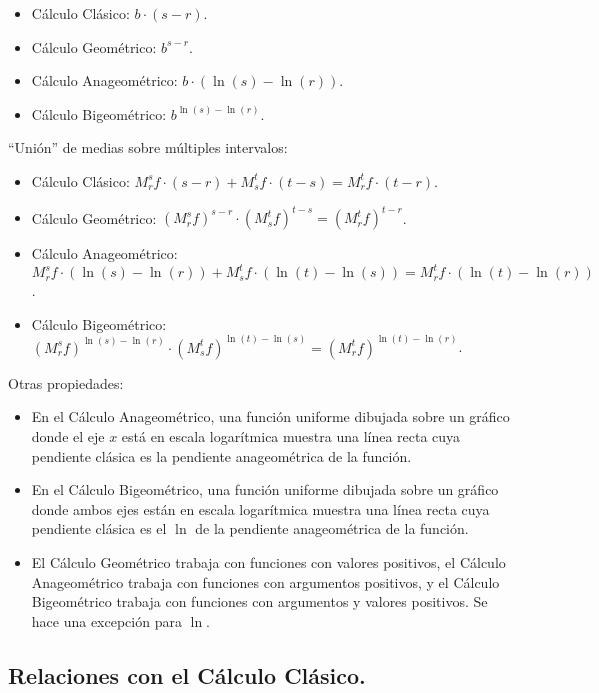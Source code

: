 \begin{itemize}
	\item Cálculo Clásico: $b \cdot (s - r)$.
	\item Cálculo Geométrico: $b^{s-r}$.
	\item Cálculo Anageométrico: $b \cdot (\ln(s) - \ln(r))$.
	\item Cálculo Bigeométrico: $b^{\ln(s) - \ln(r)}$.
\end{itemize}

\enquote{Unión} de medias sobre múltiples intervalos:

\begin{itemize}
	\item Cálculo Clásico: $M_r^s f \cdot (s - r) + M_s^t f \cdot (t - s) = M_r^t f \cdot (t - r)$.
	\item Cálculo Geométrico: $(M_r^s f)^{s - r} \cdot (M_s^t f)^{t - s} = (M_r^t f)^{t - r}$.
	\item Cálculo Anageométrico: $M_r^s f \cdot (\ln(s) - \ln(r)) + M_s^t f \cdot (\ln(t) - \ln(s)) = M_r^t f \cdot (\ln(t) - \ln(r))$.
	\item Cálculo Bigeométrico: $(M_r^s f)^{\ln(s) - \ln(r)} \cdot (M_s^t f)^{\ln(t) - \ln(s)} = (M_r^t f)^{\ln(t) - \ln(r)}$.
\end{itemize}

Otras propiedades:

\begin{itemize}
	\item En el Cálculo Anageométrico, una función uniforme dibujada sobre un gráfico donde el eje $x$ está en escala logarítmica muestra una línea recta cuya pendiente clásica es la pendiente anageométrica de la función.
	\item En el Cálculo Bigeométrico, una función uniforme dibujada sobre un gráfico donde ambos ejes están en escala logarítmica muestra una línea recta cuya pendiente clásica es el $\ln$ de la pendiente anageométrica de la función.
	\item El Cálculo Geométrico trabaja con funciones con valores positivos, el Cálculo Anageométrico trabaja con funciones con argumentos positivos, y el Cálculo Bigeométrico trabaja con funciones con argumentos y valores positivos. Se hace una excepción para $\ln$.
\end{itemize}

\subsection{Relaciones con el Cálculo Clásico.}

